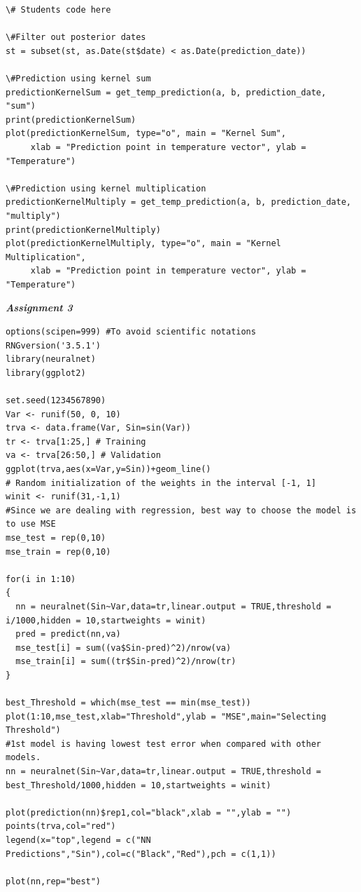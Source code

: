 \documentclass[a4paper,10pt]{article}
\begin{document}
\begin{lstlisting}
\# Students code here

\#Filter out posterior dates
st = subset(st, as.Date(st$date) < as.Date(prediction_date))

\#Prediction using kernel sum
predictionKernelSum = get_temp_prediction(a, b, prediction_date, "sum")
print(predictionKernelSum)
plot(predictionKernelSum, type="o", main = "Kernel Sum", 
     xlab = "Prediction point in temperature vector", ylab = "Temperature")

\#Prediction using kernel multiplication
predictionKernelMultiply = get_temp_prediction(a, b, prediction_date, "multiply")
print(predictionKernelMultiply)
plot(predictionKernelMultiply, type="o", main = "Kernel Multiplication", 
     xlab = "Prediction point in temperature vector", ylab = "Temperature")
\end{lstlisting} 
\par
\vspace{0.5cm}
\large \textit{\textbf{Assignment 3}} \par
\begin{lstlisting}
options(scipen=999) #To avoid scientific notations
RNGversion('3.5.1')
library(neuralnet)
library(ggplot2)

set.seed(1234567890)
Var <- runif(50, 0, 10)
trva <- data.frame(Var, Sin=sin(Var))
tr <- trva[1:25,] # Training
va <- trva[26:50,] # Validation
ggplot(trva,aes(x=Var,y=Sin))+geom_line()
# Random initialization of the weights in the interval [-1, 1]
winit <- runif(31,-1,1)
#Since we are dealing with regression, best way to choose the model is to use MSE
mse_test = rep(0,10)
mse_train = rep(0,10)

for(i in 1:10)
{
  nn = neuralnet(Sin~Var,data=tr,linear.output = TRUE,threshold = i/1000,hidden = 10,startweights = winit)
  pred = predict(nn,va)
  mse_test[i] = sum((va$Sin-pred)^2)/nrow(va)
  mse_train[i] = sum((tr$Sin-pred)^2)/nrow(tr)
}

best_Threshold = which(mse_test == min(mse_test))
plot(1:10,mse_test,xlab="Threshold",ylab = "MSE",main="Selecting Threshold")
#1st model is having lowest test error when compared with other models.
nn = neuralnet(Sin~Var,data=tr,linear.output = TRUE,threshold = best_Threshold/1000,hidden = 10,startweights = winit)

plot(prediction(nn)$rep1,col="black",xlab = "",ylab = "")
points(trva,col="red")
legend(x="top",legend = c("NN Predictions","Sin"),col=c("Black","Red"),pch = c(1,1))

plot(nn,rep="best")
\end{lstlisting}
\end{document}
